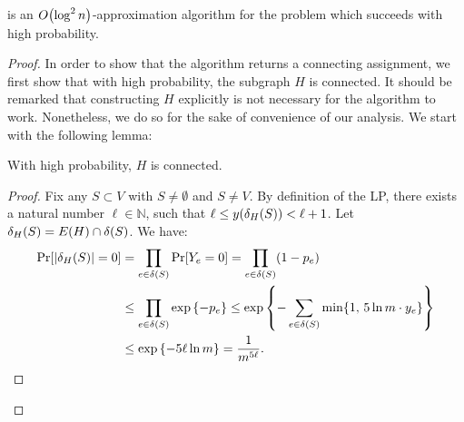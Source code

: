 \begin{theorem}
     is an $O\mathopen{}\left( \log^2 n \right)$-approximation algorithm for the \connectivity problem which succeeds with high probability.
\end{theorem}
\begin{proof}
    In order to show that the algorithm returns a connecting assignment, we first show that with high probability, the subgraph $H$ is connected. It should be remarked that constructing $H$ explicitly is not necessary for the algorithm to work. Nonetheless, we do so for the sake of convenience of our analysis. We start with the following lemma:
    \begin{lemma}
        With high probability, $H$ is connected.
    \end{lemma}
    \begin{proof}
        Fix any $S\subset V$ with $S\neq\emptyset$ and $S\neq V$. By definition of the LP, there exists a natural number $\ell\in\mathbb{N}$, such that $\ell\leq y\mathopen{}\left( \delta_H\mathopen{}\left( S \right) \right)<\ell+1$. Let $\delta_H\mathopen{}\left( S \right)=E\mathopen{}\left( H \right)\cap \delta\mathopen{}\left( S \right)$.
        We have:
        \begin{align*}
            \Pr\mathopen{}\left[ \mathopen{}\left| \delta_H\mathopen{}\left( S \right) \right|=0 \right] & = \prod_{e\in\delta\mathopen{}\left( S \right)}\Pr\mathopen{}\left[ Y_e=0 \right] = \prod_{e\in\delta\mathopen{}\left( S \right)}(1-p_e) \\&\leq \prod_{e\in\delta\mathopen{}\left( S \right)}\exp\left\{ -p_e \right\} \leq \exp\left\{ -\sum_{e\in\delta(S)}\min\mathopen{}\left\{ 1,\, 5\ln m\cdot y_e \right\} \right\}
            \\& \leq \exp\left\{ -5\ell\ln m \right\} = \frac{1}{m^{5\ell}}.
        \end{align*}


\end{proof}
\end{proof}
